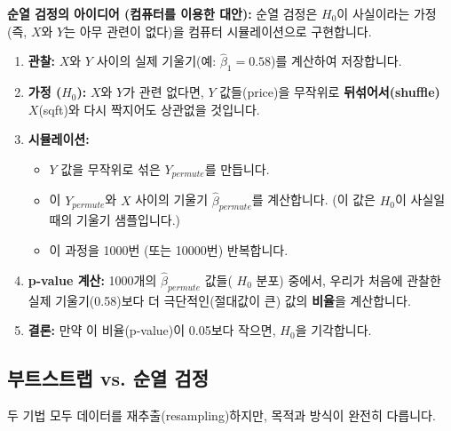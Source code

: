 \documentclass[11pt,a4paper]{book}
\theoremstyle{definition}
\begin{document}
\textbf{순열 검정의 아이디어 (컴퓨터를 이용한 대안):}
순열 검정은 $H_0$이 사실이라는 가정(즉, $X$와 $Y$는 아무 관련이 없다)을 컴퓨터 시뮬레이션으로 구현합니다.

\begin{enumerate}
    \item \textbf{관찰:} $X$와 $Y$ 사이의 실제 기울기(예: $\hat{\beta}_1 = 0.58$)를 계산하여 저장합니다.
    \item \textbf{가정 ($H_0$):} $X$와 $Y$가 관련 없다면, $Y$ 값들(price)을 무작위로 \textbf{뒤섞어서(shuffle)} $X$(sqft)와 다시 짝지어도 상관없을 것입니다.
    \item \textbf{시뮬레이션:}
        \begin{itemize}
            \item $Y$ 값을 무작위로 섞은 $Y_{permute}$를 만듭니다.
            \item 이 $Y_{permute}$와 $X$ 사이의 기울기 $\hat{\beta}_{permute}$를 계산합니다. (이 값은 $H_0$이 사실일 때의 기울기 샘플입니다.)
            \item 이 과정을 1000번 (또는 10000번) 반복합니다.
        \end{itemize}
    \item \textbf{p-value 계산:} 1000개의 $\hat{\beta}_{permute}$ 값들( $H_0$ 분포) 중에서, 우리가 처음에 관찰한 실제 기울기(0.58)보다 더 극단적인(절대값이 큰) 값의 \textbf{비율}을 계산합니다.
    \item \textbf{결론:} 만약 이 비율(p-value)이 0.05보다 작으면, $H_0$을 기각합니다.
\end{enumerate}

\subsection{부트스트랩 vs. 순열 검정}
두 기법 모두 데이터를 재추출(resampling)하지만, 목적과 방식이 완전히 다릅니다.
\end{document}
